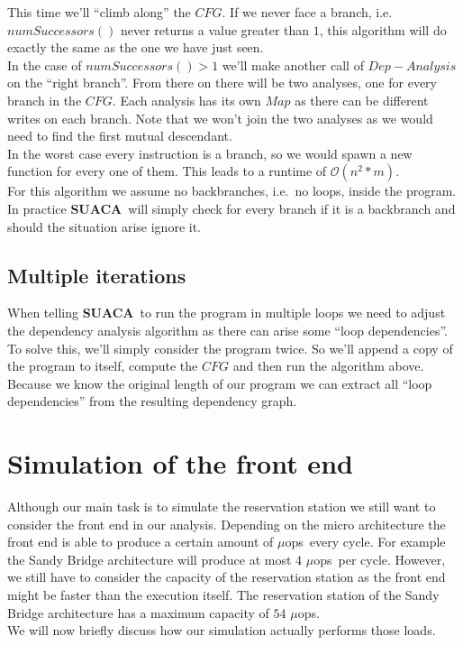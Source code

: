 \documentclass[a4paper,12pt,titlepage, twoside]{report}
\newcommand{\suaca}{\textbf{SUACA}}
\newcommand{\microops}{$\mu$ops}
\begin{document}
This time we'll ``climb along'' the $CFG$. If we never face a branch, i.e.\ $numSuccessors()$ never returns a value greater than $1$, this algorithm will do exactly the same as the one we have just seen.\\
In the case of $numSuccessors() > 1$ we'll make another call of $Dep-Analysis$ on the ``right branch''. From there on there will be two analyses, one for every branch in the $CFG$. Each analysis has its own $Map$ as there can be different writes on each branch. Note that we won't join the two analyses as we would need to find the first mutual descendant.\\
In the worst case every instruction is a branch, so we would spawn a new function for every one of them. This leads to a runtime of $\mathcal{O}(n^2*m)$.\\
For this algorithm we assume no backbranches, i.e.\ no loops, inside the program. In practice \suaca\ will simply check for every branch if it is a backbranch and should the situation arise ignore it.


\subsection{Multiple iterations}

When telling \suaca\ to run the program in multiple loops we need to adjust the dependency analysis algorithm as there can arise some ``loop dependencies''. To solve this, we'll simply consider the program twice. So we'll append a copy of the program to itself, compute the $CFG$ and then run the algorithm above. Because we know the original length of our program we can extract all ``loop dependencies'' from the resulting dependency graph.


\section{Simulation of the front end}
\label{sec:simfrontend}

Although our main task is to simulate the reservation station we still want to consider the front end in our analysis. Depending on the micro architecture the front end is able to produce a certain amount of \microops\ every cycle. For example the Sandy Bridge architecture will produce at most $4$ \microops\ per cycle. However, we still have to consider the capacity of the reservation station as the front end might be faster than the execution itself. The reservation station of the Sandy Bridge architecture has a maximum capacity of $54$ \microops.\\
We will now briefly discuss how our simulation actually performs those loads.
\end{document}
